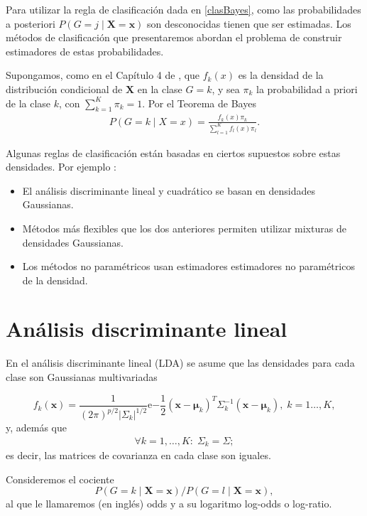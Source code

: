 \documentclass{report}
\begin{document}
 	
 
 Para utilizar la regla de clasificación dada en \eqref{clasBayes}, como  las probabilidades a posteriori $P(G=j \mid \mathbf{X}=\mathbf{x})$ son desconocidas   tienen que ser estimadas. Los métodos de clasificación que presentaremos abordan el problema de construir estimadores de estas probabilidades.
 
  Supongamos, como en el Capítulo 4 de  \cite{htf}, que $f_k(x)$ es la densidad de la distribución condicional de $\mathbf{X}$ en la clase  $G=k$, y sea $\pi_k$ la probabilidad a priori de la clase $k$, con $\sum_{k=1}^K \pi_k=1$. Por el Teorema de Bayes 
\begin{eqnarray}\label{clasBayesden}
P(G=k \mid X=x)=\frac{f_k(x) \pi_k}{\sum_{l=1}^K f_{l}(x) \pi_{l}}.
\end{eqnarray}

Algunas  reglas de clasificación están basadas en ciertos supuestos sobre estas  densidades. Por ejemplo \citep{htf}: 
\begin{itemize}
	\item El análisis discriminante lineal   y cuadrático  se basan en densidades Gaussianas.
	\item  Métodos más flexibles que los dos anteriores permiten utilizar mixturas de densidades Gaussianas.
	\item Los métodos no paramétricos usan estimadores estimadores no paramétricos de la densidad.
\end{itemize}


\section{Análisis discriminante lineal}\label{seclda}

En el análisis discriminante lineal (LDA) se asume que las densidades para cada clase son Gaussianas multivariadas  

$$
f_k(\mathbf{x})=\frac{1}{(2 \pi)^{p / 2}\left|\Sigma_k\right|^{1 / 2}} \text{e}{-\frac{1}{2}\left(\mathbf{x}- \boldsymbol{\mu}_k\right)^T \Sigma_k^{-1}\left(\mathbf{x}-\boldsymbol{\mu}_k\right)},\; k=1\ldots, K,
$$
y, además que 
\begin{eqnarray}\label{homog}
\forall k=1,\ldots, K:\;  \Sigma_k=\Sigma;
\end{eqnarray}
es decir, las matrices de covarianza en cada clase son iguales. 

Consideremos el  cociente $$P(G=k \mid\mathbf{X}=\mathbf{x})/ P(G=l \mid \mathbf{X}=\mathbf{x}), $$ al que le llamaremos (en inglés) odds y a su logaritmo log-odds o log-ratio. 
\end{document}
